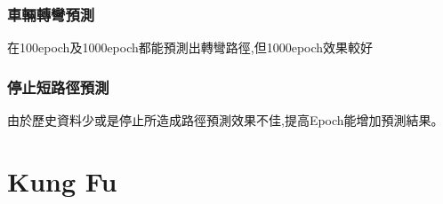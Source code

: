 \documentclass{article}
\begin{document}
\begin{itemize}
\subsubsection{車輛轉彎預測}
在100epoch及1000epoch都能預測出轉彎路徑,但1000epoch效果較好
\begin{figure}[H]
	\centering
\end{figure}

\subsubsection{停止短路徑預測}
由於歷史資料少或是停止所造成路徑預測效果不佳,提高Epoch能增加預測結果。
\begin{figure}[H]
	\centering
\end{figure}

\section{Kung Fu}


\end{itemize}
\end{document}
